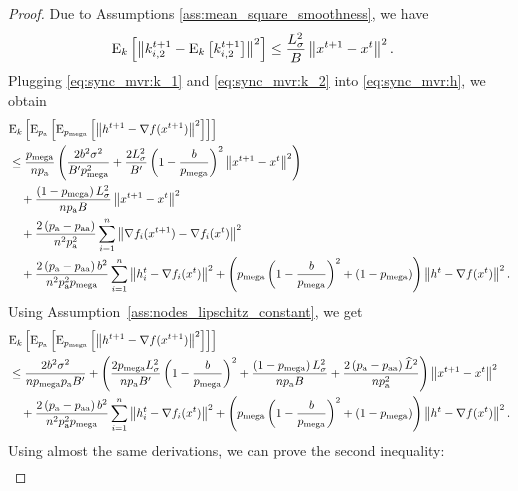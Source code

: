 \documentclass{article}
\newcommand*{\probavailable}{\ensuremath{p_{\textnormal{a}}}}
\newcommand*{\probpairaa}{\ensuremath{p_{\textnormal{aa}}}}
\newcommand*{\probmega}{\ensuremath{p_{\text{mega}}}}
\begin{document}
\begin{proof}
  Due to Assumptions \ref{ass:mean_square_smoothness}, we have
  \begin{align}
    &{\rm E}_{k}\left[\left\| k^{t+1}_{i, 2} - {\rm E}_{k}\left[k^{t+1}_{i, 2}\right] \right\|^2\right] \leq\frac{L_{\sigma}^2}{B} \left\| x^{t+1} - x^{t} \right\|^2. \label{eq:sync_mvr:k_2}
  \end{align}
  Plugging \eqref{eq:sync_mvr:k_1} and \eqref{eq:sync_mvr:k_2} into \eqref{eq:sync_mvr:h}, we obtain
  \begin{align*}
    &\ExpSub{k}{\ExpSub{\probavailable}{\ExpSub{\probmega}{\norm{h^{t+1} - \nabla f(x^{t+1})}^2}}} \nonumber\\
    &\leq \frac{\probmega}{n \probavailable}\left(\frac{2 b^2 \sigma^2}{B' \probmega^2} + \frac{2 L_{\sigma}^2}{B'}\left(1 - \frac{b}{\probmega}\right)^2 \norm{x^{t+1} - x^{t}}^2\right) \nonumber\\
    &\quad +  \frac{\left(1 - \probmega\right)L_{\sigma}^2}{n \probavailable B} \norm{x^{t+1} - x^{t}}^2 \nonumber\\
    &\quad + \frac{2\left(\probavailable - \probpairaa\right)}{n^2 \probavailable^2}\sum_{i=1}^n\norm{\nabla f_i(x^{t+1}) - \nabla f_i(x^{t})}^2 \nonumber\\
    &\quad + \frac{2\left(\probavailable - \probpairaa\right) b^2}{n^2 \probavailable^2 \probmega}\sum_{i=1}^n\norm{h^t_i -  \nabla f_i(x^{t})}^2 + \left(\probmega \left(1 - \frac{b}{\probmega}\right)^2 + (1 - \probmega)\right) \norm{h^{t} - \nabla f(x^{t})}^2.
  \end{align*}
  Using Assumption~\ref{ass:nodes_lipschitz_constant}, we get
  \begin{align*}
    &\ExpSub{k}{\ExpSub{\probavailable}{\ExpSub{\probmega}{\norm{h^{t+1} - \nabla f(x^{t+1})}^2}}} \nonumber\\
    &\leq \frac{2 b^2 \sigma^2}{n \probmega \probavailable B'} + \left(\frac{2 \probmega L_{\sigma}^2}{n \probavailable B'}\left(1 - \frac{b}{\probmega}\right)^2 + \frac{\left(1 - \probmega\right)L_{\sigma}^2}{n \probavailable B} + \frac{2\left(\probavailable - \probpairaa\right) \widehat{L}^2}{n \probavailable^2}\right)\norm{x^{t+1} - x^{t}}^2 \nonumber\\
    &\quad + \frac{2\left(\probavailable - \probpairaa\right) b^2}{n^2 \probavailable^2 \probmega}\sum_{i=1}^n\norm{h^t_i -  \nabla f_i(x^{t})}^2 + \left(\probmega \left(1 - \frac{b}{\probmega}\right)^2 + (1 - \probmega)\right) \norm{h^{t} - \nabla f(x^{t})}^2.
  \end{align*}
  Using almost the same derivations, we can prove the second inequality:
  \begin{align*}

\end{align*}
\end{proof}
\end{document}
